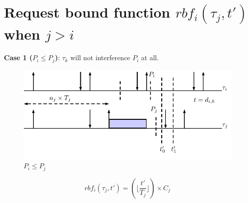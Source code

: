 \documentclass[12pt,conference,onecolumn]{IEEEtran}
\begin{document}
\section{Request bound function $rbf_i(\tau_j,t')$ when $j> i$}
 

\textbf{Case 1 ($P_i\leq P_j$)}: $\tau_k$ will not interference $P_i$ at all. 

	\begin{figure}[h!]
 \centering
\includegraphics[scale=1]{Figure/C3}  
\caption{$P_i\leq P_j$}
  \label{fig:p3}
\end{figure}
		\begin{equation}
		rbf_i(\tau_j,t')=(\lfloor \frac{t'}{T_j} \rfloor)\times C_j
	\end{equation}






\end{document}
